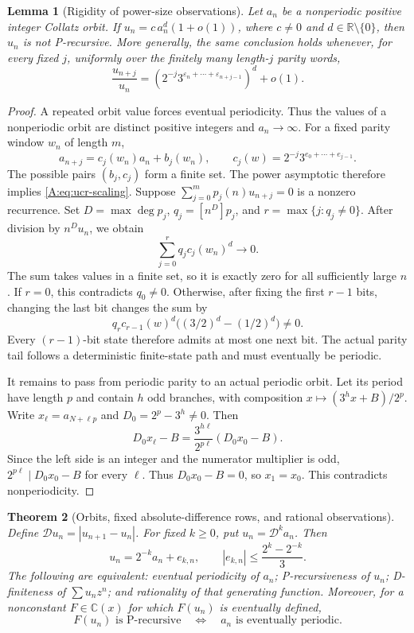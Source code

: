 \documentclass[11pt,a4paper]{article}
\newtheorem{theorem}{Theorem}[section]
\newtheorem{lemma}[theorem]{Lemma}
\theoremstyle{definition}
\theoremstyle{remark}
\numberwithin{equation}{section}
\begin{document}
\begin{lemma}[Rigidity of power-size observations]
\label{A:lem:ucr-power}
Let $a_n$ be a nonperiodic positive integer Collatz orbit.
If $u_n=c\,a_n^d(1+o(1))$, where $c\ne0$ and
$d\in\mathbb R\setminus\{0\}$, then $u_n$ is not P-recursive.
More generally, the same conclusion holds whenever, for every fixed
$j$, uniformly over the finitely many length-$j$ parity words,
\begin{equation}
 \frac{u_{n+j}}{u_n}
 =\left(2^{-j}3^{\varepsilon_n+\cdots+\varepsilon_{n+j-1}}\right)^d
 +o(1).
 \label{A:eq:ucr-scaling}
\end{equation}
\end{lemma}

\begin{proof}
A repeated orbit value forces eventual periodicity. Thus the values of
a nonperiodic orbit are distinct positive integers and $a_n\to\infty$.
For a fixed parity window $w_n$ of length $m$,
\[
 a_{n+j}=c_j(w_n)a_n+b_j(w_n),\qquad
 c_j(w)=2^{-j}3^{e_0+\cdots+e_{j-1}}.
\]
The possible pairs $(b_j,c_j)$ form a finite set. The power asymptotic
therefore implies \eqref{A:eq:ucr-scaling}.
Suppose $\sum_{j=0}^m p_j(n)u_{n+j}=0$ is a nonzero recurrence.
Set $D=\max\deg p_j$, $q_j=[n^D]p_j$, and
$r=\max\{j:q_j\ne0\}$. After division by $n^Du_n$, we obtain
\[
 \sum_{j=0}^r q_j c_j(w_n)^d\longrightarrow0.
\]
The sum takes values in a finite set, so it is exactly zero for all
sufficiently large $n$. If $r=0$, this contradicts $q_0\ne0$.
Otherwise, after fixing the first $r-1$ bits, changing the last bit
changes the sum by
\[
 q_r c_{r-1}(w)^d\bigl((3/2)^d-(1/2)^d\bigr)\ne0.
\]
Every $(r-1)$-bit state therefore admits at most one next bit.
The actual parity tail follows a deterministic finite-state path and
must eventually be periodic.

It remains to pass from periodic parity to an actual periodic orbit.
Let its period have length $p$ and contain $h$ odd branches, with
composition $x\mapsto(3^hx+B)/2^p$.
Write $x_\ell=a_{N+\ell p}$ and $D_0=2^p-3^h\ne0$.
Then
\[
 D_0x_\ell-B=
 \frac{3^{h\ell}}{2^{p\ell}}(D_0x_0-B).
\]
Since the left side is an integer and the numerator multiplier is odd,
$2^{p\ell}\mid D_0x_0-B$ for every $\ell$.
Thus $D_0x_0-B=0$, so $x_1=x_0$. This contradicts nonperiodicity.
\end{proof}

\begin{theorem}[Orbits, fixed absolute-difference rows, and rational observations]
\label{A:thm:ucr-rational}
Define $\mathcal D u_n=|u_{n+1}-u_n|$. For fixed $k\geq0$, put
$u_n=\mathcal D^k a_n$. Then
\begin{equation}
 u_n=2^{-k}a_n+e_{k,n},\qquad
 |e_{k,n}|\leq\frac{2^k-2^{-k}}3.
 \label{A:eq:ucr-error}
\end{equation}
The following are equivalent: eventual periodicity of $a_n$;
P-recursiveness of $u_n$; D-finiteness of $\sum u_nz^n$; and rationality
of that generating function.
Moreover, for a nonconstant $F\in\mathbb C(x)$ for which $F(u_n)$ is
eventually defined,
\[
 F(u_n)\text{ is P-recursive}
 \quad\Longleftrightarrow\quad a_n\text{ is eventually periodic}.
\]
\end{theorem}
\end{document}
